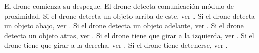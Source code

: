 \begin{UCtrayectoria}
	\UCpaso [\UCactor] El drone comienza su despegue.
	\UCpaso [\UCactor] El drone detecta comunicación módulo de proximidad.	
	\UCpaso Si el drone detecta un objeto arriba de este, ver .
	\UCpaso Si el drone detecta un objeto abajo, ver .
	\UCpaso Si el drone detecta un objeto adelante, ver .
	\UCpaso Si el drone detecta un objeto atras, ver .
	\UCpaso Si el drone tiene que girar a la izquierda, ver .
	\UCpaso Si el drone tiene que girar a la derecha, ver .
	\UCpaso Si el drone tiene detenerse, ver .
\end{UCtrayectoria}








